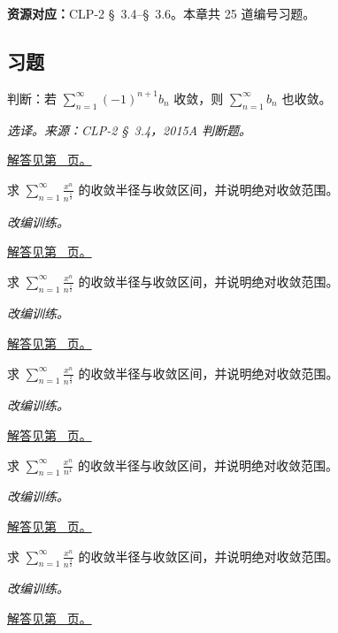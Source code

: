 \documentclass[UTF8,12pt,a4paper,fontset=fandol]{ctexart}
\begin{document}
\textbf{资源对应：}CLP-2 \S~3.4--\S~3.6。本章共 25 道编号习题。
\subsection{习题}
\begin{example}[交错收敛不推出绝对收敛]\label{ex:c26q1}
判断：若 $\sum_{n=1}^\infty(-1)^{n+1}b_n$ 收敛，则 $\sum_{n=1}^\infty b_n$ 也收敛。
\par\textit{选译。来源：CLP-2 \S~3.4，2015A 判断题。}\par\hyperref[ans:c26q1]{解答见第~\pageref{ans:c26q1} 页。}
\end{example}
\begin{example}[交错幂级数的端点]\label{ex:c26q2}
求 $\displaystyle\sum_{n=1}^\infty\frac{x^n}{n^{\frac{1}{3}}}$ 的收敛半径与收敛区间，并说明绝对收敛范围。
\par\textit{改编训练。}\par\hyperref[ans:c26q2]{解答见第~\pageref{ans:c26q2} 页。}
\end{example}
\begin{example}[交错幂级数的端点]\label{ex:c26q3}
求 $\displaystyle\sum_{n=1}^\infty\frac{x^n}{n^{\frac{1}{2}}}$ 的收敛半径与收敛区间，并说明绝对收敛范围。
\par\textit{改编训练。}\par\hyperref[ans:c26q3]{解答见第~\pageref{ans:c26q3} 页。}
\end{example}
\begin{example}[交错幂级数的端点]\label{ex:c26q4}
求 $\displaystyle\sum_{n=1}^\infty\frac{x^n}{n^{\frac{2}{3}}}$ 的收敛半径与收敛区间，并说明绝对收敛范围。
\par\textit{改编训练。}\par\hyperref[ans:c26q4]{解答见第~\pageref{ans:c26q4} 页。}
\end{example}
\begin{example}[交错幂级数的端点]\label{ex:c26q5}
求 $\displaystyle\sum_{n=1}^\infty\frac{x^n}{n^{1}}$ 的收敛半径与收敛区间，并说明绝对收敛范围。
\par\textit{改编训练。}\par\hyperref[ans:c26q5]{解答见第~\pageref{ans:c26q5} 页。}
\end{example}
\begin{example}[交错幂级数的端点]\label{ex:c26q6}
求 $\displaystyle\sum_{n=1}^\infty\frac{x^n}{n^{\frac{3}{2}}}$ 的收敛半径与收敛区间，并说明绝对收敛范围。
\par\textit{改编训练。}\par\hyperref[ans:c26q6]{解答见第~\pageref{ans:c26q6} 页。}
\end{example}
\end{document}
